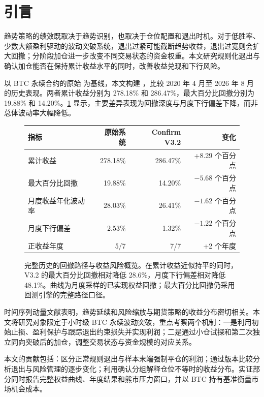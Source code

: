 \section{引言}

趋势策略的绩效既取决于趋势识别，也取决于仓位配置和退出时机。对于低胜率、少数大额盈利驱动的波动突破系统，退出过紧可能截断趋势收益，退出过宽则会扩大回撤；分阶段加仓进一步改变不同交易状态的资金权重。本文研究规则化退出与确认加仓能否在保持累计收益水平的同时，改善收益兑现和下行风险。

以 BTC 永续合约的原始 \Original 为基线，本文构建 \Vthree，比较 2020 年 4 月至 2026 年 8 月的历史表现。两者累计收益分别为 278.18\% 和 286.47\%，最大百分比回撤分别为 19.88\% 和 14.20\%。\cref{fig:opening-risk} 显示，主要差异表现为回撤深度与月度下行偏差下降，而非总体波动率大幅降低。

\begin{figure}[H]
  \centering

  \vspace{0.35em}
  \small
  \renewcommand{\arraystretch}{1.18}
  \begin{tabular}{lrrr}
    \toprule
    指标 & 原始系统 & Confirm V3.2 & 变化\\
    \midrule
    累计收益 & 278.18\% & 286.47\% & +8.29 个百分点\\
    最大百分比回撤 & 19.88\% & 14.20\% & $-5.68$ 个百分点\\
    月度收益年化波动率 & 28.03\% & 26.41\% & $-1.62$ 个百分点\\
    月度下行偏差 & 2.53\% & 1.32\% & $-1.22$ 个百分点\\
    正收益年度 & 5/7 & 7/7 & +2 个年度\\
    \bottomrule
  \end{tabular}
  \caption{完整历史的回撤路径与收益风险概览。在累计收益近似持平的同时，V3.2 的最大百分比回撤相对降低 28.6\%，月度下行偏差相对降低 48.1\%。曲线为月度采样的已实现权益回撤；最大百分比回撤仍采用回测引擎的完整路径口径。}
  \label{fig:opening-risk}
\end{figure}

时间序列动量文献表明，趋势延续和风险缩放与期货策略的收益分布密切相关\cite{moskowitz2012,harvey2018}。本文将研究对象限定于小时级 BTC 永续波动突破，重点考察两个机制：一是利用初始止损、盈利保护与跟踪退出约束损失并实现利润；二是通过小仓试探和第二次独立同向突破后的加仓，调整交易状态与资金规模的对应关系。

本文的贡献包括：区分正常规则退出与样本末端强制平仓的利润；通过版本比较分析退出与风险管理的逐步变化；利用确认分组解释仓位不等时的收益分布。实证部分同时报告完整权益曲线、年度结果和熊市压力窗口，并以 BTC 持有基准衡量市场机会成本。
